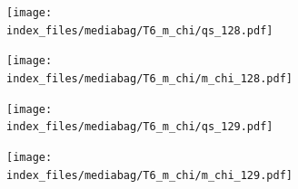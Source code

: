 \documentclass[
  11pt,
  letterpaper,
]{scrreprt}
\begin{document}
\begin{figure}

\begin{minipage}{0.50\linewidth}

\begin{figure}[H]

{\centering \texttt{[image: index\_files/mediabag/T6\_m\_chi/qs\_128.pdf]}

}


\end{figure}%

\end{minipage}%
%
\begin{minipage}{0.50\linewidth}

\begin{figure}[H]

{\centering \texttt{[image: index\_files/mediabag/T6\_m\_chi/m\_chi\_128.pdf]}

}


\end{figure}%

\end{minipage}%

\end{figure}%

\begin{figure}

\begin{minipage}{0.50\linewidth}

\begin{figure}[H]

{\centering \texttt{[image: index\_files/mediabag/T6\_m\_chi/qs\_129.pdf]}

}


\end{figure}%

\end{minipage}%
%
\begin{minipage}{0.50\linewidth}

\begin{figure}[H]

{\centering \texttt{[image: index\_files/mediabag/T6\_m\_chi/m\_chi\_129.pdf]}

}


\end{figure}%

\end{minipage}%

\end{figure}%
\end{document}
